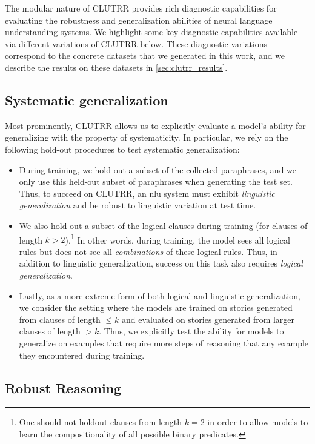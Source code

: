 \documentclass[letterpaper, 12pt]{report}
\begin{document}
The modular nature of CLUTRR provides rich diagnostic capabilities for evaluating the robustness and generalization abilities of neural language understanding systems.
We highlight some key diagnostic capabilities available via different variations of CLUTRR below.
These diagnostic variations correspond to the concrete datasets that we generated in this work, and we describe the results on these datasets in \autoref{sec:clutrr_results}.

\subsection{Systematic generalization}

Most prominently, CLUTRR allows us to explicitly evaluate a model's ability for generalizing with the property of systematicity.
In particular, we rely on the following hold-out procedures to test systematic generalization:
\begin{itemize}[leftmargin=*, topsep=2pt, itemsep=2pt, parsep=2pt]
    \item During training, we hold out a subset of the collected paraphrases, and we only use this held-out subset of paraphrases when generating the test set.
    Thus, to succeed on CLUTRR, an \acrshort{nlu} system must exhibit {\em linguistic generalization} and be robust to linguistic variation at test time.
    \item We also hold out a subset of the logical clauses during training (for clauses of length $k > 2$).\footnote{One should not holdout clauses from length $k=2$ in order to allow models to learn the compositionality of all possible binary predicates.}
    In other words, during training, the model sees all logical rules but does not see all {\em combinations} of these logical rules.
    Thus, in addition to linguistic generalization, success on this task also requires {\em logical generalization}.
    \item
    Lastly, as a more extreme form of both logical and linguistic generalization, we consider the setting where the models are trained on stories generated from clauses of length ${\leq k}$ and evaluated on stories generated from larger clauses of length ${>k}$. Thus, we explicitly test the ability for models to generalize on examples that require more steps of reasoning that any example they encountered during training.
\end{itemize}

\subsection{Robust Reasoning}
\label{sec:clutrr_robust_data}
\end{document}
